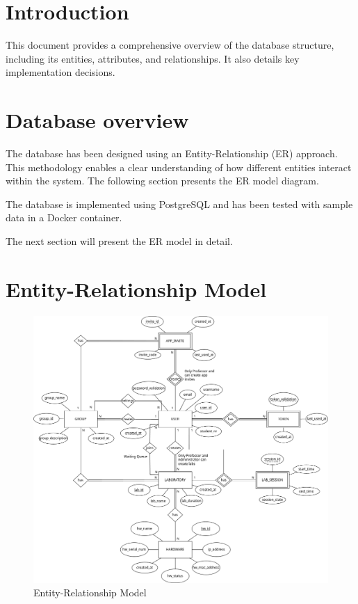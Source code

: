 \documentclass[a4paper,twoside,11pt]{article}
\begin{document}
\section{Introduction}
This document provides a comprehensive overview of the database structure, including its entities, attributes, and relationships. 
It also details key implementation decisions.

\section{Database overview}
The database has been designed using an Entity-Relationship (ER) approach.
This methodology enables a clear understanding of how different entities interact within the system. The following section presents the ER model diagram.

The database is implemented using PostgreSQL and has been tested with sample data in a Docker container.

The next section will present the ER model in detail.
\section{Entity-Relationship Model}
\begin{figure}[htbp]
	\centering
	\includegraphics[width=\textwidth]{../img/ERDiagramRL.drawio}
	\caption{Entity-Relationship Model}
	\label{fig:ERModel}
\end{figure}
\end{document}
